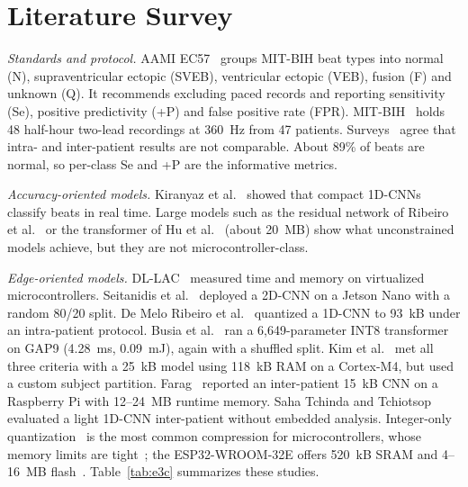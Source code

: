 \documentclass[conference]{IEEEtran}
\begin{document}
\section{Literature Survey}
\emph{Standards and protocol.} AAMI EC57~\cite{aami2012ec57} groups MIT-BIH beat types into normal (N), supraventricular ectopic (SVEB), ventricular ectopic (VEB), fusion (F) and unknown (Q). It recommends excluding paced records and reporting sensitivity (Se), positive predictivity (+P) and false positive rate (FPR). MIT-BIH~\cite{moody2001impact,goldberger2000physiobank} holds 48 half-hour two-lead recordings at 360~Hz from 47 patients. Surveys~\cite{xiao2023review,luz2016survey} agree that intra- and inter-patient results are not comparable. About 89\% of beats are normal, so per-class Se and +P are the informative metrics.

\emph{Accuracy-oriented models.} Kiranyaz et al.~\cite{kiranyaz2016realtime} showed that compact 1D-CNNs classify beats in real time. Large models such as the residual network of Ribeiro et al.~\cite{ribeiro2020automatic} or the transformer of Hu et al.~\cite{hu2022transformer} (about 20~MB) show what unconstrained models achieve, but they are not microcontroller-class.

\emph{Edge-oriented models.} DL-LAC~\cite{sakib2021ultraedge} measured time and memory on virtualized microcontrollers. Seitanidis et al.~\cite{seitanidis2022edge} deployed a 2D-CNN on a Jetson Nano with a random 80/20 split. De Melo Ribeiro et al.~\cite{demeloribeiro2022quantized} quantized a 1D-CNN to 93~kB under an intra-patient protocol. Busia et al.~\cite{busia2025tiny} ran a 6,649-parameter INT8 transformer on GAP9 (4.28~ms, 0.09~mJ), again with a shuffled split. Kim et al.~\cite{kim2024ultraedge} met all three criteria with a 25~kB model using 118~kB RAM on a Cortex-M4, but used a custom subject partition. Farag~\cite{farag2023tiny} reported an inter-patient 15~kB CNN on a Raspberry Pi with 12--24~MB runtime memory. Saha Tchinda and Tchiotsop~\cite{sahatchinda2025lightweight} evaluated a light 1D-CNN inter-patient without embedded analysis. Integer-only quantization~\cite{jacob2018quantization} is the most common compression for microcontrollers, whose memory limits are tight~\cite{lin2022ondevice}; the ESP32-WROOM-32E offers 520~kB SRAM and 4--16~MB flash~\cite{espressif2023esp32}. Table~\ref{tab:e3c} summarizes these studies.
\end{document}
